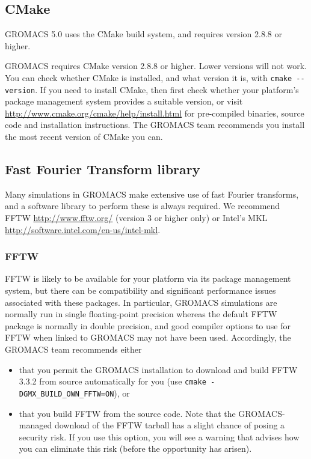 \documentclass{article}[12pt,a4paper,twoside]
\newcommand{\gromacs}{GROMACS}
\newcommand{\fftw}{FFTW}
\newcommand{\mkl}{MKL}
\newcommand{\cmake}{CMake}
\newcommand{\fftwversion}{3.3.2}
\newcommand{\cmakeversion}{2.8.8}
\newcommand{\gromacsversion}{5.0}
\begin{document}
\subsection{CMake}

\gromacs{} \gromacsversion{} uses the \cmake{} build system, and
requires version \cmakeversion{} or higher.

\gromacs{} requires \cmake{} version \cmakeversion{} or higher. Lower
versions will not work. You can check whether \cmake{} is installed,
and what version it is, with \verb+cmake --version+. If you need to
install \cmake{}, then first check whether your platform's package
management system provides a suitable version, or visit
\url{http://www.cmake.org/cmake/help/install.html} for pre-compiled
binaries, source code and installation instructions. The \gromacs{}
team recommends you install the most recent version of \cmake{} you
can.

\subsection{Fast Fourier Transform library}

Many simulations in \gromacs{} make extensive use of fast Fourier transforms,
and a software library to perform these is always required. We
recommend \fftw{} \url{http://www.fftw.org/} (version 3 or higher
only) or Intel's \mkl{} \url{http://software.intel.com/en-us/intel-mkl}. 

\subsubsection{\fftw{}}

\fftw{} is likely to be available for your platform via its package
management system, but there can be compatibility and significant
performance issues associated with these packages. In particular,
\gromacs{} simulations are normally run in single floating-point
precision whereas the default \fftw{} package is normally in double
precision, and good compiler options to use for \fftw{} when linked to
\gromacs{} may not have been used. Accordingly, the \gromacs{} team
recommends either
\begin{itemize}
\item that you permit the \gromacs{} installation to download and
  build \fftw{} \fftwversion{} from source automatically for you (use
  \verb+cmake -DGMX_BUILD_OWN_FFTW=ON+), or
\item that you build \fftw{} from the source code.
Note that the GROMACS-managed download of the FFTW tarball has a
slight chance of posing a security risk. If you use this option, you
will see a warning that advises how you can eliminate this risk
(before the opportunity has arisen).
\end{itemize}
\end{document}
